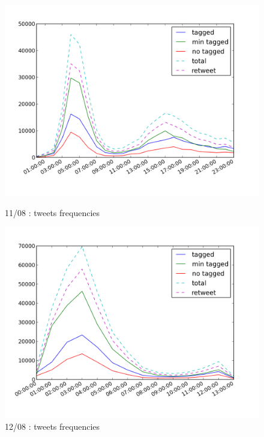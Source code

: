 \documentclass[a4paper,12pt]{report}
\begin{document}
\begin{figure}[H]
\begin{minipage}[t]{0.48\textwidth}
\begin{center}
	\includegraphics[width=\textwidth]{images/freqs/freq_11_08.png}
	\caption{11/08 : tweets frequencies}
\end{center}
\end{minipage}
\hfill
\begin{minipage}[t]{0.48\textwidth}
\begin{center}
	\includegraphics[width=\textwidth]{images/freqs/freq_12_08.png}
	\caption{12/08 : tweets frequencies}
\end{center}
\end{minipage}
\end{figure}
\end{document}
